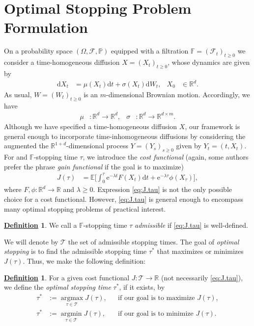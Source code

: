 \documentclass[12pt]{book}
\let\varphi\phi
\numberwithin{equation}{chapter}
\theoremstyle{plain}
\numberwithin{theorem}{section}
\theoremstyle{definition}
\newtheorem{definition}[theorem]{\underline{Definition}}
\numberwithin{exercise}{chapter}
\newcommand{\<}{\langle}
\renewcommand{\>}{\rangle}
\renewcommand{\(}{\left(}
\renewcommand{\)}{\right)}
\renewcommand{\[}{\left[}
\renewcommand{\]}{\right]}
\newcommand\Eb{\mathds{E}}
\newcommand\Fb{\mathds{F}}
\newcommand\Pb{\mathds{P}}
\newcommand\Rb{\mathds{R}}
\newcommand\Fc{\mathscr{F}}
\newcommand\Tc{\mathscr{T}}
\newcommand\Om{\Omega}
\newcommand\sig{\sigma}
\newcommand\lam{\lambda}
\newcommand\dd{\mathrm{d}}
\newcommand\ee{\mathrm{e}}
\begin{document}
\section{Optimal Stopping Problem Formulation}
\label{sec:optimal.stopping}
On a probability space $(\Om,\Fc,\Pb)$ equipped with a filtration $\Fb = (\Fc_t)_{t \geq 0}$ we consider a time-homogeneous diffusion $X = (X_t)_{t \geq 0}$, whose dynamics are given by
\begin{align}
\dd X_t
	&=	\mu(X_t) \dd t + \sig(X_t) \dd W_t , &
X_0
	&\in \Rb^d . \label{eq:thd}
\end{align}
As usual, $W = (W_t)_{t \geq 0}$ is an $m$-dimensional Brownian motion.  Accordingly, we have
\begin{align}
\mu
	&: \Rb^d \to \Rb^d , &
\sig
	&: \Rb^d \to \Rb^{d \times m} .
\end{align}
Although we have specified a time-homogeneous diffusion $X$, our framework is general enough to incorporate time-inhomogeneous diffusions by considering the augmented the $\Rb^{1+d}$-dimensional process $Y = (Y_s)_{s \geq 0}$ given by $Y_t = (t,X_t)$.
\\[0.5em]
For  and $\Fb$-stopping time $\tau$, we introduce the \emph{cost functional} (again, some authors prefer the phrase \emph{gain functional} if the goal is to maximize)
\begin{align}
J(\tau)
	&=	\Eb \Big[ \int_0^\tau \ee^{-\lam t} F(X_t) \dd t + \ee^{-\lam \tau} \varphi(X_\tau) \Big] , \label{eq:J.tau}
\end{align}
where $F,\varphi : \Rb^d \to \Rb$ and $\lam \geq 0$.  Expression \eqref{eq:J.tau} is not the only possible choice for a cost functional.  However, \eqref{eq:J.tau} is general enough to encompass many optimal stopping problems of practical interest.

\begin{definition}
\label{def:tau.admissible}
We call a $\Fb$-stopping time $\tau$ \emph{admissible} if \eqref{eq:J.tau} is well-defined.
\end{definition}

\noindent We will denote by $\Tc$ the set of admissible stopping times.  The goal of \emph{optimal stopping} is to find the admissible stopping time $\tau^*$ that maximizes or minimizes $J(\tau)$.  Thus, we make the following definition:

\begin{definition}
For a given cost functional $J : \Tc \to \Rb$ (not necessarily \eqref{eq:J.tau}), we define the \emph{optimal stopping time} $\tau^*$, if it exists, by 
\begin{align}
\tau^*
	&:=	\operatorname*{argmax}_{\tau \in \Tc} J(\tau) , &
	&\text{if our goal is to maximize $J(\tau)$}, \\
\tau^*
	&:=	\operatorname*{argmin}_{\tau \in \Tc} J(\tau) , &
	&\text{if our goal is to minimize $J(\tau)$}.
\end{align}
\end{definition}
\end{document}
